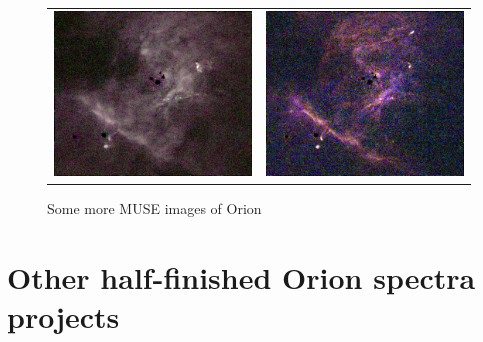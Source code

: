 \documentclass[preprint]{aastex}
\begin{document}
\begin{figure}
\begin{tabular}{@{}l@{}l@{}}
    \includegraphics{rgb-Fe3}
    & \includegraphics{rgb-Fe2} \\
  \end{tabular}
  \caption{Some more MUSE images of Orion}
  \label{fig:MUSE-rgb-2}
\end{figure}


\section{Other half-finished Orion spectra projects}
\label{sec:other}
\end{document}
